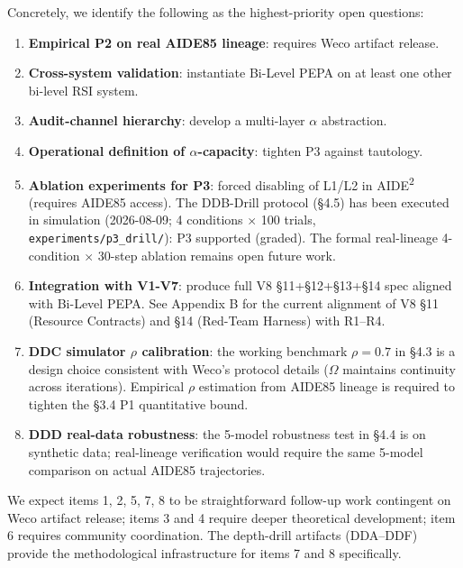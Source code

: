 Concretely, we identify the following as the highest-priority open questions:
\begin{enumerate}
    \item \textbf{Empirical P2 on real AIDE85 lineage}: requires Weco artifact release.
    \item \textbf{Cross-system validation}: instantiate Bi-Level PEPA on at least one other bi-level RSI system.
    \item \textbf{Audit-channel hierarchy}: develop a multi-layer $\alpha$ abstraction.
    \item \textbf{Operational definition of $\alpha$-capacity}: tighten P3 against tautology.
    \item \textbf{Ablation experiments for P3}: forced disabling of L1/L2 in AIDE\textsuperscript{2} (requires AIDE85 access). The DDB-Drill protocol (\S4.5) has been executed in simulation (2026-08-09; 4 conditions $\times$ 100 trials, \texttt{experiments/p3\_drill/}): P3 supported (graded). The formal real-lineage 4-condition $\times$ 30-step ablation remains open future work.
    \item \textbf{Integration with V1-V7}: produce full V8 \S11+\S12+\S13+\S14 spec aligned with Bi-Level PEPA. See Appendix B for the current alignment of V8 \S11 (Resource Contracts) and \S14 (Red-Team Harness) with R1--R4.
    \item \textbf{DDC simulator $\rho$ calibration}: the working benchmark $\rho = 0.7$ in \S4.3 is a design choice consistent with Weco's protocol details ($\Omega$ maintains continuity across iterations). Empirical $\rho$ estimation from AIDE85 lineage is required to tighten the \S3.4 P1 quantitative bound.
    \item \textbf{DDD real-data robustness}: the 5-model robustness test in \S4.4 is on synthetic data; real-lineage verification would require the same 5-model comparison on actual AIDE85 trajectories.
\end{enumerate}

We expect items 1, 2, 5, 7, 8 to be straightforward follow-up work contingent on Weco artifact release; items 3 and 4 require deeper theoretical development; item 6 requires community coordination. The depth-drill artifacts (DDA--DDF) provide the methodological infrastructure for items 7 and 8 specifically.
